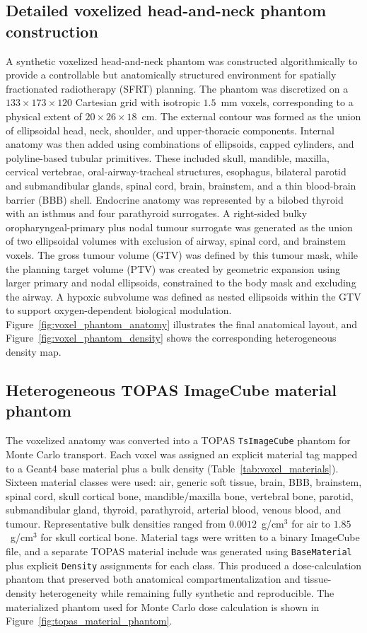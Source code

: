 \subsection{Detailed voxelized head-and-neck phantom construction}
A synthetic voxelized head-and-neck phantom was constructed algorithmically to provide a controllable but anatomically structured environment for spatially fractionated radiotherapy (SFRT) planning. The phantom was discretized on a $133 \times 173 \times 120$ Cartesian grid with isotropic $1.5$~mm voxels, corresponding to a physical extent of $20 \times 26 \times 18$~cm. The external contour was formed as the union of ellipsoidal head, neck, shoulder, and upper-thoracic components. Internal anatomy was then added using combinations of ellipsoids, capped cylinders, and polyline-based tubular primitives. These included skull, mandible, maxilla, cervical vertebrae, oral-airway-tracheal structures, esophagus, bilateral parotid and submandibular glands, spinal cord, brain, brainstem, and a thin blood-brain barrier (BBB) shell. Endocrine anatomy was represented by a bilobed thyroid with an isthmus and four parathyroid surrogates. A right-sided bulky oropharyngeal-primary plus nodal tumour surrogate was generated as the union of two ellipsoidal volumes with exclusion of airway, spinal cord, and brainstem voxels. The gross tumour volume (GTV) was defined by this tumour mask, while the planning target volume (PTV) was created by geometric expansion using larger primary and nodal ellipsoids, constrained to the body mask and excluding the airway. A hypoxic subvolume was defined as nested ellipsoids within the GTV to support oxygen-dependent biological modulation. Figure~\ref{fig:voxel_phantom_anatomy} illustrates the final anatomical layout, and Figure~\ref{fig:voxel_phantom_density} shows the corresponding heterogeneous density map.

\subsection{Heterogeneous TOPAS ImageCube material phantom}
The voxelized anatomy was converted into a TOPAS \texttt{TsImageCube} phantom for Monte Carlo transport. Each voxel was assigned an explicit material tag mapped to a Geant4 base material plus a bulk density (Table~\ref{tab:voxel_materials}). Sixteen material classes were used: air, generic soft tissue, brain, BBB, brainstem, spinal cord, skull cortical bone, mandible/maxilla bone, vertebral bone, parotid, submandibular gland, thyroid, parathyroid, arterial blood, venous blood, and tumour. Representative bulk densities ranged from $0.0012$~g/cm$^3$ for air to $1.85$~g/cm$^3$ for skull cortical bone. Material tags were written to a binary ImageCube file, and a separate TOPAS material include was generated using \texttt{BaseMaterial} plus explicit \texttt{Density} assignments for each class. This produced a dose-calculation phantom that preserved both anatomical compartmentalization and tissue-density heterogeneity while remaining fully synthetic and reproducible. The materialized phantom used for Monte Carlo dose calculation is shown in Figure~\ref{fig:topas_material_phantom}.

